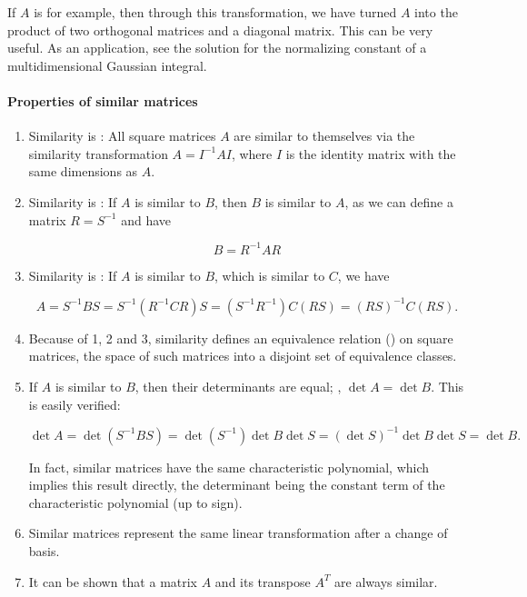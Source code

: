 \documentclass{article}
\begin{document}
If $A$ is  for example, then through this transformation, we have turned $A$ into the product of two orthogonal matrices and a diagonal matrix.  This can be very useful.  As an application, see the solution for the normalizing constant of a multidimensional Gaussian integral.

\paragraph{Properties of similar matrices}
\begin{enumerate}
\item Similarity is : All square matrices $A$ are similar to themselves via the similarity transformation $A=I^{-1}AI$, where $I$ is the identity matrix with the same dimensions as $A$.

\item Similarity is : If $A$ is similar to $B$, then $B$ is similar to $A$, as we can define a matrix $R=S^{-1}$ and have

\begin{equation}
B=R^{-1}AR
\end{equation}

\item Similarity is : If $A$ is similar to $B$, which is similar to $C$, we have

\begin{equation}
A=S^{-1}BS=S^{-1}(R^{-1}CR)S=(S^{-1}R^{-1})C(RS)=(RS)^{-1}C(RS).
\end{equation}

\item Because of 1, 2 and 3, similarity defines an equivalence relation () on square matrices,  the space of such matrices into a disjoint set of equivalence classes.

\item If $A$ is similar to $B$, then their determinants are equal; , $\det A=\det B$.  This is easily verified:

\begin{equation}
\det A=\det(S^{-1}BS)=\det(S^{-1})\det B \det S=(\det S)^{-1}\det B \det S=\det B.
\end{equation}

In fact, similar matrices have the same characteristic polynomial, which implies this result directly, the determinant being the constant term of the characteristic polynomial (up to sign).

\item Similar matrices represent the same linear transformation after a change of basis.

\item It can be shown that a matrix $A$ and its transpose $A^T$ are always similar.
\end{enumerate}
\end{document}
